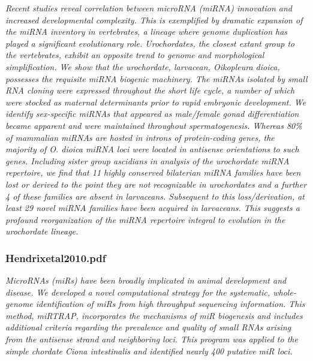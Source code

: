 \documentclass[graybox]{svmult}
\begin{document}
\cite{Fu2008}
\textit{Recent studies reveal correlation between microRNA (miRNA) innovation and increased developmental complexity. This is exemplified by dramatic expansion of the miRNA inventory in vertebrates, a lineage where genome duplication has played a significant evolutionary role. Urochordates, the closest extant group to the vertebrates, exhibit an opposite trend to genome and morphological simplification. We show that the urochordate, larvacean, Oikopleura dioica, possesses the requisite miRNA biogenic machinery. The miRNAs isolated by small RNA cloning were expressed throughout the short life cycle, a number of which were stocked as maternal determinants prior to rapid embryonic development. We identify sex-specific miRNAs that appeared as male/female gonad differentiation became apparent and were maintained throughout spermatogenesis. Whereas 80{\%} of mammalian miRNAs are hosted in introns of protein-coding genes, the majority of O. dioica miRNA loci were located in antisense orientations to such genes. Including sister group ascidians in analysis of the urochordate miRNA repertoire, we find that 11 highly conserved bilaterian miRNA families have been lost or derived to the point they are not recognizable in urochordates and a further 4 of these families are absent in larvaceans. Subsequent to this loss/derivation, at least 29 novel miRNA families have been acquired in larvaceans. This suggests a profound reorganization of the miRNA repertoire integral to evolution in the urochordate lineage.}

\subsubsection{Hendrixetal2010.pdf}
\cite{Hendrix2010}
\textit{MicroRNAs (miRs) have been broadly implicated in animal development and disease. We developed a novel computational strategy for the systematic, whole-genome identification of miRs from high throughput sequencing information. This method, miRTRAP, incorporates the mechanisms of miR biogenesis and includes additional criteria regarding the prevalence and quality of small RNAs arising from the antisense strand and neighboring loci. This program was applied to the simple chordate Ciona intestinalis and identified nearly 400 putative miR loci.}
\end{document}
